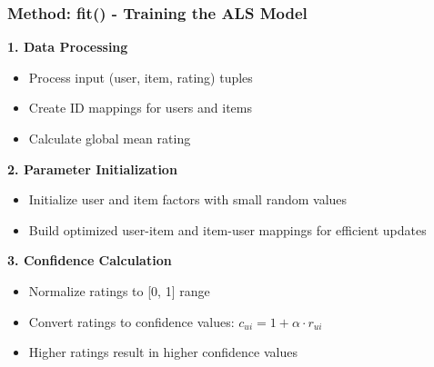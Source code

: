 \documentclass{beamer}
\begin{document}
\begin{frame}
\frametitle{Method: fit() - Training the ALS Model}

    \textbf{1. Data Processing}
    \begin{itemize}
        \item Process input (user, item, rating) tuples
        \item Create ID mappings for users and items
        \item Calculate global mean rating
    \end{itemize}

    \vspace{0.5cm}
    
    \textbf{2. Parameter Initialization}
    \begin{itemize}
        \item Initialize user and item factors with small random values
        \item Build optimized user-item and item-user mappings for efficient updates
    \end{itemize}

    \vspace{0.5cm}
    
    \textbf{3. Confidence Calculation}
    \begin{itemize}
        \item Normalize ratings to [0, 1] range
        \item Convert ratings to confidence values: $c_{ui} = 1 + \alpha \cdot r_{ui}$ 
        \item Higher ratings result in higher confidence values
    \end{itemize}
\end{frame}
\end{document}
